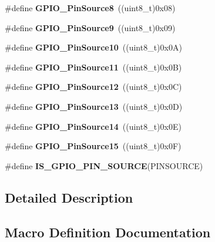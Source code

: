 \begin{DoxyCompactItemize}
\#define {\bfseries G\+P\+I\+O\+\_\+\+Pin\+Source8}~((uint8\+\_\+t)0x08)
\item 
\mbox{\label{group___g_p_i_o___pin__sources_gabaaed5961f2b9862082f74e18f5c3f0e}} 
\#define {\bfseries G\+P\+I\+O\+\_\+\+Pin\+Source9}~((uint8\+\_\+t)0x09)
\item 
\mbox{\label{group___g_p_i_o___pin__sources_gacec97d9c2d319b450f699adff6430c86}} 
\#define {\bfseries G\+P\+I\+O\+\_\+\+Pin\+Source10}~((uint8\+\_\+t)0x0\+A)
\item 
\mbox{\label{group___g_p_i_o___pin__sources_ga446be4a99e84eefb5c71a643211f598b}} 
\#define {\bfseries G\+P\+I\+O\+\_\+\+Pin\+Source11}~((uint8\+\_\+t)0x0\+B)
\item 
\mbox{\label{group___g_p_i_o___pin__sources_gaaa64892c00d50b0fa49f0ce72a83e6e0}} 
\#define {\bfseries G\+P\+I\+O\+\_\+\+Pin\+Source12}~((uint8\+\_\+t)0x0\+C)
\item 
\mbox{\label{group___g_p_i_o___pin__sources_gace4beb385facd306324fa9e362df5fda}} 
\#define {\bfseries G\+P\+I\+O\+\_\+\+Pin\+Source13}~((uint8\+\_\+t)0x0\+D)
\item 
\mbox{\label{group___g_p_i_o___pin__sources_ga5fbb540a86af4015a46ac16c61ddb1f7}} 
\#define {\bfseries G\+P\+I\+O\+\_\+\+Pin\+Source14}~((uint8\+\_\+t)0x0\+E)
\item 
\mbox{\label{group___g_p_i_o___pin__sources_ga9b29d9a9ecb1579ecedf4ea53ccbfd5b}} 
\#define {\bfseries G\+P\+I\+O\+\_\+\+Pin\+Source15}~((uint8\+\_\+t)0x0\+F)
\item 
\#define {\bfseries I\+S\+\_\+\+G\+P\+I\+O\+\_\+\+P\+I\+N\+\_\+\+S\+O\+U\+R\+CE}(P\+I\+N\+S\+O\+U\+R\+CE)
\end{DoxyCompactItemize}


\subsection{Detailed Description}


\subsection{Macro Definition Documentation}
\mbox{\label{group___g_p_i_o___pin__sources_ga689e4e72591136b6a8d4df9d895181f7}} 
